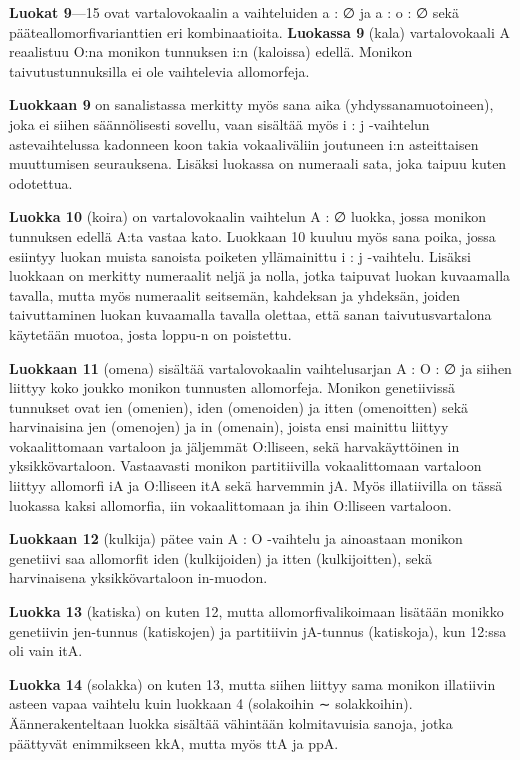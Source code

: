 \documentclass[free]{flammie}
\begin{document}
\textbf{Luokat 9}—15 ovat vartalovokaalin a vaihteluiden a : ∅ ja a : o : ∅ sekä pääteallomorfivarianttien eri kombinaatioita.
\textbf{Luokassa 9} (kala) vartalovokaali A reaalistuu O:na monikon tunnuksen i:n (kaloissa) edellä. Monikon taivutustunnuksilla ei ole vaihtelevia allomorfeja.

\textbf{Luokkaan 9} on sanalistassa merkitty myös sana aika (yhdyssanamuotoineen), joka ei siihen säännölisesti sovellu, vaan sisältää myös i : j -vaihtelun astevaihtelussa kadonneen koon takia vokaaliväliin joutuneen i:n asteittaisen muuttumisen
seurauksena. Lisäksi luokassa on numeraali sata, joka taipuu kuten odotettua.

\textbf{Luokka 10} (koira) on vartalovokaalin vaihtelun A : ∅ luokka, jossa monikon tunnuksen edellä A:ta vastaa kato. Luokkaan 10 kuuluu myös sana poika, jossa esiintyy luokan muista sanoista poiketen yllämainittu i : j -vaihtelu. Lisäksi luokkaan
on merkitty numeraalit neljä ja nolla, jotka taipuvat luokan kuvaamalla tavalla,
mutta myös numeraalit seitsemän, kahdeksan ja yhdeksän, joiden taivuttaminen
luokan kuvaamalla tavalla olettaa, että sanan taivutusvartalona käytetään muotoa,
josta loppu-n on poistettu.

\textbf{Luokkaan 11} (omena) sisältää vartalovokaalin vaihtelusarjan A : O : ∅ ja siihen
liittyy koko joukko monikon tunnusten allomorfeja. Monikon genetiivissä tunnukset ovat ien (omenien), iden (omenoiden) ja itten (omenoitten) sekä harvinaisina
jen (omenojen) ja in (omenain), joista ensi mainittu liittyy vokaalittomaan vartaloon ja jäljemmät O:lliseen, sekä harvakäyttöinen in yksikkövartaloon. Vastaavasti monikon partitiivilla vokaalittomaan vartaloon liittyy allomorfi iA ja O:lliseen
itA sekä harvemmin jA. Myös illatiivilla on tässä luokassa kaksi allomorfia, iin
vokaalittomaan ja ihin O:lliseen vartaloon.

\textbf{Luokkaan 12} (kulkija) pätee vain A : O -vaihtelu ja ainoastaan monikon genetiivi
saa allomorfit iden (kulkijoiden) ja itten (kulkijoitten), sekä harvinaisena yksikkövartaloon in-muodon.

\textbf{Luokka 13} (katiska) on kuten 12, mutta allomorfivalikoimaan lisätään monikko
genetiivin jen-tunnus (katiskojen) ja partitiivin jA-tunnus (katiskoja), kun 12:ssa
oli vain itA.

\textbf{Luokka 14} (solakka) on kuten 13, mutta siihen liittyy sama monikon illatiivin asteen vapaa vaihtelu kuin luokkaan 4 (solakoihin ∼ solakkoihin). Äännerakenteltaan luokka sisältää vähintään kolmitavuisia sanoja, jotka päättyvät enimmikseen
kkA, mutta myös ttA ja ppA.
\end{document}

